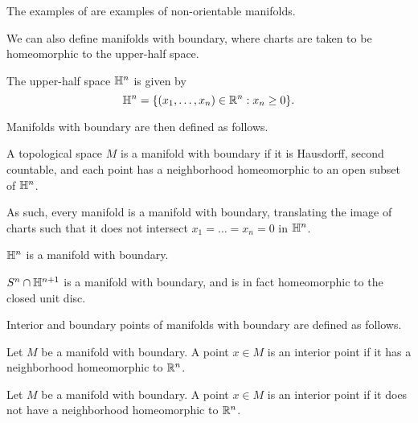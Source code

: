 \begin{remark}
    The examples of  are examples of non-orientable manifolds. 
\end{remark}
We can also define manifolds with boundary, where charts are taken to be homeomorphic to the upper-half space. 
\begin{definition}\label{def: upper-half space}
    The upper-half space $\mathbb{H}^{n}$ is given by 
    $$\mathbb{H}^{n}=\{(x_{1},\dots,x_{n})\in\mathbb{R}^{n}:x_{n}\geq0\}.$$
\end{definition}
Manifolds with boundary are then defined as follows. 
\begin{definition}\label{def: manifold with boundary}
    A topological space $M$ is a manifold with boundary if it is Hausdorff, second countable, and each point has a neighborhood homeomorphic to an open subset of $\mathbb{H}^{n}$. 
\end{definition}
\begin{remark}
    As such, every manifold is a manifold with boundary, translating the image of charts such that it does not intersect $x_{1}=\dots=x_{n}=0$ in $\mathbb{H}^{n}$. 
\end{remark}
\begin{example}
    $\mathbb{H}^{n}$ is a manifold with boundary. 
\end{example}
\begin{example}
    $S^{n}\cap\mathbb{H}^{n+1}$ is a manifold with boundary, and is in fact homeomorphic to the closed unit disc. 
\end{example}
Interior and boundary points of manifolds with boundary are defined as follows. 
\begin{definition}\label{def: interior point}
    Let $M$ be a manifold with boundary. A point $x\in M$ is an interior point if it has a neighborhood homeomorphic to $\mathbb{R}^{n}$. 
\end{definition}
\begin{definition}\label{def: boundary point}
    Let $M$ be a manifold with boundary. A point $x\in M$ is an interior point if it does not have a neighborhood homeomorphic to $\mathbb{R}^{n}$. 
\end{definition}